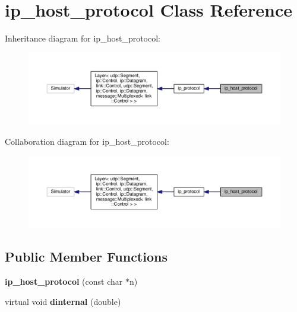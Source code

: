 \hypertarget{classip__host__protocol}{}\section{ip\+\_\+host\+\_\+protocol Class Reference}
\label{classip__host__protocol}


Inheritance diagram for ip\+\_\+host\+\_\+protocol\+:\nopagebreak
\begin{figure}[H]
\begin{center}
\leavevmode
\includegraphics[width=350pt]{classip__host__protocol__inherit__graph}
\end{center}
\end{figure}


Collaboration diagram for ip\+\_\+host\+\_\+protocol\+:\nopagebreak
\begin{figure}[H]
\begin{center}
\leavevmode
\includegraphics[width=350pt]{classip__host__protocol__coll__graph}
\end{center}
\end{figure}
\subsection*{Public Member Functions}
\begin{DoxyCompactItemize}
\item 
{\bfseries ip\+\_\+host\+\_\+protocol} (const char $\ast$n)\hypertarget{classip__host__protocol_a29412893a5845c69af6031eb6734e8c0}{}\label{classip__host__protocol_a29412893a5845c69af6031eb6734e8c0}

\item 
virtual void {\bfseries dinternal} (double)\hypertarget{classip__host__protocol_a2e2c43aeb81ae38702b7dec6f7df9227}{}\label{classip__host__protocol_a2e2c43aeb81ae38702b7dec6f7df9227}

\end{DoxyCompactItemize}
